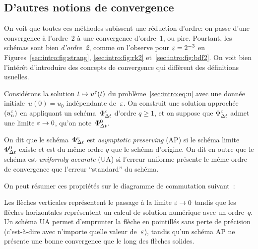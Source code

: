\subsection*{D'autres notions de convergence}

On voit que toutes ces méthodes subissent une réduction d'ordre: on passe d'une convergence à l'ordre~2 à une convergence d'ordre~1, ou pire. Pourtant, les schémas sont bien \textit{d'ordre~2}, comme on l'observe pour $\varepsilon = 2^{-3}$ en Figures~\ref{sec:intro:fig:strang}, \ref{sec:intro:fig:rk2} et~\ref{sec:intro:fig:bdf2}. On voit bien l'intérêt d'introduire des concepts de convergence qui diffèrent des définitions usuelles. 

\begin{FRdefinition*}
    Considérons la solution $t \mapsto u^{\varepsilon}(t)$ du problème~\eqref{sec:intro:eq:u} avec une donnée initiale~$u(0) = u_0$ indépendante de~$\varepsilon$. On construit une solution approchée~$(u^{\varepsilon} _n)$ en appliquant un schéma~$\Phi^{\varepsilon} _{\Delta t}$ d'ordre $q \geq 1$, et on suppose que $\Phi^{\varepsilon}_{\Delta t}$ admet une limite $\varepsilon \rightarrow 0$, qu'on note~$\Phi^0_{\Delta t}$. 

    On dit que le schéma~$\Phi_{\Delta t}^{\varepsilon}$ est \emph{asymptotic preserving} (AP) si le schéma limite~$\Phi^0_{\Delta t}$ existe et est du même ordre $q$ que le schéma d'origine. On dit en outre que le schéma est \emph{uniformly accurate} (UA) si l'erreur uniforme présente le même ordre de convergence que l'erreur \enquote{standard} du schéma. 
\end{FRdefinition*}

On peut résumer ces propriétés sur le diagramme de commutation suivant~:
\begin{center}
\end{center}
Les flèches verticales représentent le passage à la limite $\varepsilon \rightarrow 0$ tandis que les flèches horizontales représentent un calcul de solution numérique avec un ordre~$q$. Un schéma UA permet d'emprunter la flèche en pointillés sans perte de précision (c'est-à-dire avec n'importe quelle valeur de~$\varepsilon$), tandis qu'un schéma AP ne présente une bonne convergence que le long des flèches solides. 


